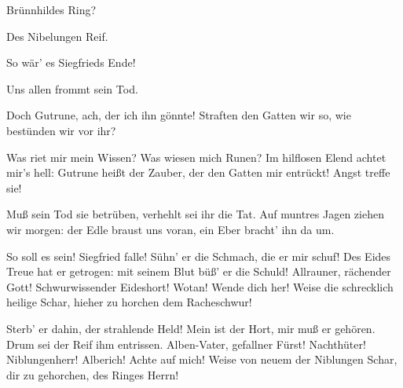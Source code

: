 \begin{drama}
\Guntherspeaks



Brünnhildes Ring?
 

\Hagenspeaks

Des Nibelungen Reif.
 

\Guntherspeaks



So wär' es Siegfrieds Ende!
 

\Hagenspeaks

Uns allen frommt sein Tod.
 

\Guntherspeaks

Doch Gutrune, ach, der ich ihn gönnte!
Straften den Gatten wir so,
wie bestünden wir vor ihr?
 

\Brunnhildespeaks



Was riet mir mein Wissen?
Was wiesen mich Runen?
Im hilflosen Elend achtet mir's hell:
Gutrune heißt der Zauber,
der den Gatten mir entrückt!
Angst treffe sie!
 

\Hagenspeaks



Muß sein Tod sie betrüben,
verhehlt sei ihr die Tat.
Auf muntres Jagen ziehen wir morgen:
der Edle braust uns voran,
ein Eber bracht' ihn da um.
 

So soll es sein! Siegfried falle!
Sühn' er die Schmach, die er mir schuf!
Des Eides Treue hat er getrogen:
mit seinem Blut büß' er die Schuld!
Allrauner, rächender Gott!
Schwurwissender Eideshort!
Wotan! Wende dich her!
Weise die schrecklich heilige Schar,
hieher zu horchen dem Racheschwur!
 

\Hagenspeaks

Sterb' er dahin, der strahlende Held!
Mein ist der Hort, mir muß er gehören.
Drum sei der Reif ihm entrissen.
Alben-Vater, gefallner Fürst!
Nachthüter! Niblungenherr!
Alberich! Achte auf mich!
Weise von neuem der Niblungen Schar,
dir zu gehorchen, des Ringes Herrn!
 

   


\end{drama}
